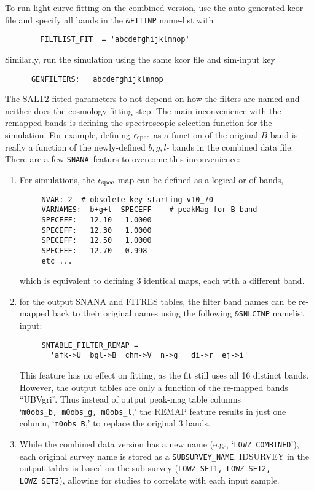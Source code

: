 \documentclass[12pt]{article}
\newcommand{\snana}{{\tt SNANA}}
\newcommand{\simeffspec}{\epsilon_{\rm spec}}
\begin{document}
\noindent To run light-curve fitting on the combined version, 
use the auto-generated kcor file and specify all bands in the 
{\tt \&FITINP} name-list with
\begin{verbatim}
        FILTLIST_FIT  = 'abcdefghijklmnop'
\end{verbatim}
Similarly, run the simulation using the same kcor file and
sim-input key
\begin{verbatim}
      GENFILTERS:   abcdefghijklmnop
\end{verbatim}

The SALT2-fitted parameters to not depend on how the filters
are named and neither does the cosmology fitting step. The main
inconvenience with the remapped bands is defining the spectroscopic 
selection function for the simulation. For example, defining 
$\simeffspec$ as a function of the original $B$-band is 
really a function of the newly-defined $b,g,l$- bands in the 
combined data file. There are a few \snana\ featurs to overcome 
this inconvenience:
%
\begin{enumerate}
 \item  For simulations, the $\simeffspec$ map can be defined
   as a logical-or of bands,
    \vspace{-0.5cm} \begin{verbatim}
     NVAR: 2  # obsolete key starting v10_70
     VARNAMES:  b+g+l  SPECEFF    # peakMag for B band
     SPECEFF:   12.10   1.0000
     SPECEFF:   12.30   1.0000
     SPECEFF:   12.50   1.0000
     SPECEFF:   12.70   0.998
     etc ... 
    \end{verbatim}    \vspace{-0.8cm}
   which is equivalent to defining 3 identical maps, each
   with a different band.
%
  \item for the output SNANA and FITRES tables, the filter band 
        names can be re-mapped back to their original names
        using the following {\tt\&SNLCINP} namelist input: 
    \vspace{-0.5cm} \begin{verbatim}
     SNTABLE_FILTER_REMAP = 
       'afk->U  bgl->B  chm->V  n->g   di->r  ej->i'
    \end{verbatim}    \vspace{-0.8cm}
%
   This feature has no effect on fitting, as the fit still uses
   all 16 distinct bands. However, the output tables are only a 
   function of the re-mapped bands ``UBVgri''.  Thus instead of
   output peak-mag table columns `{\tt m0obs\_b,~m0obs\_g,~m0obs\_l},'
   the REMAP feature results in just one column, `{\tt m0obs\_B},' 
   to replace the original 3 bands. 
%
 \item While the combined data version has a new name 
   (e.g., `{\tt LOWZ\_COMBINED}'),
   each original survey name is stored as a {\tt SUBSURVEY\_NAME}. 
   IDSURVEY in the output tables is based on
   the sub-survey ({\tt LOWZ\_SET1, LOWZ\_SET2, LOWZ\_SET3}), 
   allowing for studies to correlate with each input sample.
%
\end{enumerate}
\end{document}
